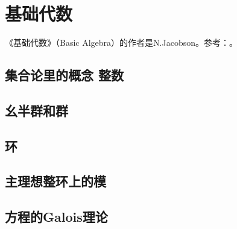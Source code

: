 \part{基础代数}
《基础代数》（Basic Algebra）的作者是N.Jacobson。参考：\cite{BasicAlgebra1987}。

\chapter{集合论里的概念 \quad 整数}\label{ch00501}


\chapter{幺半群和群}\label{ch00502}



\chapter{环}\label{ch00503}


\chapter{主理想整环上的模}\label{ch00504}



\chapter{方程的Galois理论}\label{ch00505}

















